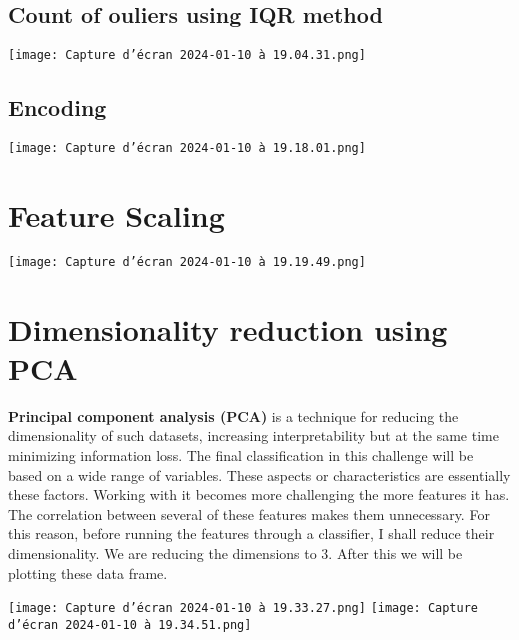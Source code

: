 \documentclass[12pt,a4paper]{report}
\begin{document}
\section{Count of ouliers  using IQR method}

\begin{center}
    \texttt{[image: Capture d’écran 2024-01-10 à 19.04.31.png]}
   
\end{center} 

\section{Encoding}

\begin{center}
    \texttt{[image: Capture d’écran 2024-01-10 à 19.18.01.png]}
   
\end{center} 


\chapter{Feature Scaling}
\begin{center}
    \texttt{[image: Capture d’écran 2024-01-10 à 19.19.49.png]}
   
\end{center} 






\chapter{Dimensionality reduction using PCA}
\textbf{Principal component analysis (PCA)} is a technique for reducing the dimensionality of such
datasets, increasing interpretability but at the same time minimizing information loss.
The final classification in this challenge will be based on a wide range of variables. These aspects
or characteristics are essentially these factors. Working with it becomes more challenging the more
features it has. The correlation between several of these features makes them unnecessary. For this
reason, before running the features through a classifier, I shall reduce their dimensionality.
We are reducing the dimensions to 3. After this we will be plotting these data frame.
\begin{center}
    \texttt{[image: Capture d’écran 2024-01-10 à 19.33.27.png]}
    \texttt{[image: Capture d’écran 2024-01-10 à 19.34.51.png]}
   
\end{center} 
\newpage
\end{document}
